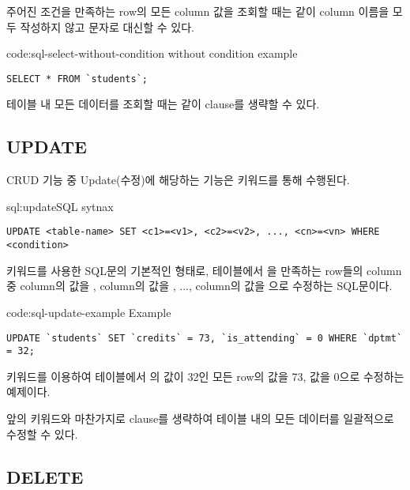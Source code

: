 주어진 조건을 만족하는 row의 모든 column 값을 조회할 때는 \와 같이 column 이름을 모두 작성하지 않고 \cd{*} 문자로 대신할 수 있다.

\begin{code}{code:sql-select-without-condition}{ without condition example}
\begin{verbatim}
SELECT * FROM `students`;
\end{verbatim}
\end{code}

테이블 내 모든 데이터를 조회할 때는 \과 같이  clause를 생략할 수 있다.

\subsection*{UPDATE}

CRUD 기능 중 Update(수정)에 해당하는 기능은  키워드를 통해 수행된다.

\begin{sql}{sql:update}{SQL  sytnax}
\begin{verbatim}
UPDATE <table-name> SET <c1>=<v1>, <c2>=<v2>, ..., <cn>=<vn> WHERE <condition>
\end{verbatim}
\end{sql}

\는  키워드를 사용한 SQL문의 기본적인 형태로,  테이블에서 을 만족하는 row들의 column 중  column의 값을 ,  column의 값을 , ...,  column의 값을 으로 수정하는 SQL문이다.

\begin{code}{code:sql-update-example}{ Example}
\begin{verbatim}
UPDATE `students` SET `credits` = 73, `is_attending` = 0 WHERE `dptmt` = 32;
\end{verbatim}
\end{code}

\은  키워드를 이용하여  테이블에서 의 값이 32인 모든 row의  값을 73,  값을 0으로 수정하는 예제이다.

앞의  키워드와 마찬가지로  clause를 생략하여 테이블 내의 모든 데이터를 일괄적으로 수정할 수 있다.

\subsection*{DELETE}

